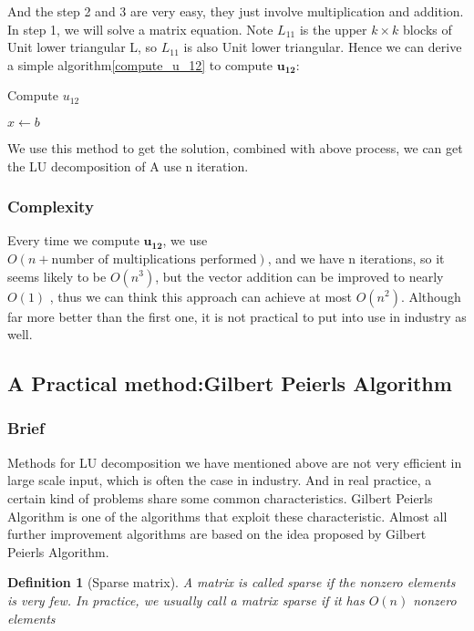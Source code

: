 \documentclass[11pt]{article}
\newtheorem{definition}[theorem]{Definition}
\begin{document}
And the step 2 and 3 are very easy, they just involve multiplication and addition. In step 1, we will solve a matrix equation. Note $L_{11}$ is the upper $k\times k$ blocks of Unit lower triangular L, so $L_{11}$ is also Unit lower triangular. Hence we can derive a simple algorithm\ref{compute_u_12} to compute $\pmb{u_{12}}$:
\begin{algorithm}
\caption{Compute $u_{12}$}
$x\gets b$\;
{
}
\label{compute_u_12}
\end{algorithm}
We use this method to get the solution, combined with above process, we can get the LU decomposition of A use n iteration.

\subsubsection{Complexity}
Every time we compute $\pmb{u_{12}}$, we use $O(n+\text{number of multiplications performed})$, and we have n iterations, so it seems likely to be $O(n^3)$, but the vector addition can be improved to nearly $O(1)$ , thus we can think this approach can achieve at most $O(n^2)$. Although far more better than the first one, it is not practical to put into use in industry as well.

\subsection{A Practical method:Gilbert Peierls Algorithm}
\subsubsection{Brief}
Methods for LU decomposition we have mentioned above are not very efficient in large scale input, which is often the case in industry. And in real practice, a certain kind of problems share some common characteristics. Gilbert Peierls Algorithm is one of the algorithms that exploit these characteristic. Almost all further improvement algorithms are based on the idea proposed by Gilbert Peierls Algorithm.
\begin{definition}
[Sparse matrix]
A matrix is called sparse if the nonzero elements is very few. In practice, we usually call a matrix sparse if it has $O(n)$ nonzero elements
\end{definition}
\end{document}

